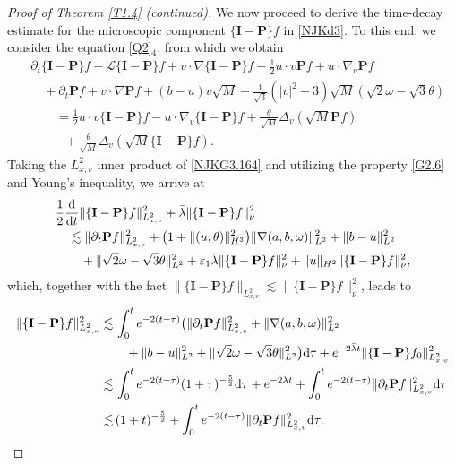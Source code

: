 \documentclass[reqno,11pt]{amsart}
\theoremstyle{plain}
\numberwithin{equation}{section}
\newcommand{\eps}{{\varepsilon}}
\begin{document}
\begin{proof}[Proof of Theorem \ref{T1.4} \emph{(}continued\emph{)}]
We now proceed to derive the time-decay estimate  for the microscopic
 component $\{\mathbf{I}-\mathbf{P}\}f$ in \eqref{NJKd3}. To this end, we consider the equation 
 \eqref{Q2}$_4$, from which we obtain  
\begin{align}\label{NJKG3.164}
&\partial_t \{\mathbf{I}-\mathbf{P}\}f-\mathcal{L}{\{\mathbf{I}-\mathbf{P}\}}f
+v\cdot\nabla\{\mathbf{I}-\mathbf{P}\}f-\frac{1}{2}u\cdot v\mathbf{P}f+u\cdot\nabla_v\mathbf{P}f\nonumber\\
&\quad +\partial_t {\mathbf{P}f}+v\cdot\nabla {\mathbf{P}f}+(b-u)v\sqrt{M}
+\frac{1}{\sqrt{3}}(|v|^2-3)\sqrt{M}(\sqrt{2}\omega-\sqrt{3}\theta)\nonumber\\
&\qquad =  \frac{1}{2}u\cdot v\{\mathbf{I}-\mathbf{P}\}f
-u\cdot \nabla_v\{\mathbf{I}-\mathbf{P}\}f+\frac{\theta}{\sqrt{M}} \Delta_v(\sqrt{M}  \mathbf{P}f)\nonumber\\
& \qquad \ \ \, +\frac{\theta}{\sqrt{M}} \Delta_v(\sqrt{M} \{\mathbf{I}- \mathbf{P}\}f).
\end{align}
Taking the $L^2_{x,v}$ inner product of \eqref{NJKG3.164} and utilizing the
 property \eqref{G2.6} and Young's inequality, we  arrive at
\begin{align*} 
&\frac{1}{2}  \frac{\rm d}{{\rm d}t} \|\{\mathbf{I}-
\mathbf{P}\}f\|_{L_{x,v}^2}^2+\bar\lambda \|\{\mathbf{I}-\mathbf{P}\}f\|_{\nu}^2\nonumber\\
&\quad \lesssim \|\partial_t{\mathbf{P}f} \|_{L_{x,v}^2}^2
+\big(1+\|(u,\theta)\|_{H^2}^2\big)\|\nabla(a,b,\omega)\|_{L^2}^2+\|b-u\|_{L^2}^2
\nonumber\\
&\qquad+\|\sqrt{2}\omega-\sqrt{3}\theta\|_{L^2}^2 
+\eps_1\bar\lambda\|\{\mathbf{I}-\mathbf{P}\}f\|_{\nu}^2+\|u\|_{H^2}\|\{\mathbf{I}-\mathbf{P}\}f\|_{\nu}^2,
\end{align*}
which, together with the fact $ \|\{\mathbf{I}-\mathbf{P}\}f\|_{L_{x,v}^2} 
\lesssim\|\{\mathbf{I}-\mathbf{P}\}f\|_{\nu}^2$, leads to
\begin{align}\label{NJKG3.165}
  \|\{\mathbf{I}-\mathbf{P}\}f\|_{L_{x,v}^2}^2 
 \lesssim&\, \int_0^t e^{-2(t-\tau)}\big( \|\partial_t{\mathbf{P}f} 
 \|_{L_{x,v}^2}^2+\|\nabla(a,b,\omega)\|_{L^2}^2\nonumber\\
 & \quad + \|b-u\|_{L^2}^2
 +\|\sqrt{2}\omega-\sqrt{3}\theta\|_{L^2}^2  \big){\rm d}\tau %
  +e^{-2\bar\lambda t}  \|\{\mathbf{I}-\mathbf{P}\}f_0\|_{L_{x,v}^2}^2\nonumber\\
 \lesssim&\, \int_0^t e^{-2(t-\tau)}(1+\tau)^{-\frac{5}{2}}{\rm d}\tau
 +e^{-2\bar\lambda t}+ \int_0^t e^{-2(t-\tau)}  \|\partial_t{\mathbf{P}f} \|_{L_{x,v}^2}^2{\rm d}\tau\nonumber\\
 \lesssim&\,(1+t)^{-\frac{5}{2}} + \int_0^t e^{-2(t-\tau)}  \|\partial_t{\mathbf{P}f} \|_{L_{x,v}^2}^2{\rm d}\tau.
\end{align}


\end{proof}
\end{document}

